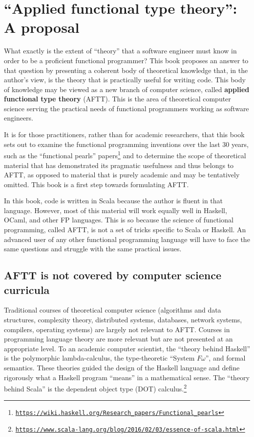 
\chapter{``Applied functional type theory'': A proposal\label{chap:Applied-functional-type}}

What exactly is the extent of ``theory'' that a software engineer
must know in order to be a proficient functional programmer? This
book proposes an answer to that question by presenting a coherent
body of theoretical knowledge that, in the author's view, is the theory
that is practically useful for writing code. This body of knowledge
may be viewed as a new branch of computer science, called \textbf{applied
functional type theory} (AFTT). This is the area of theoretical computer
science serving the practical needs of functional programmers working
as software engineers.

It is for those practitioners, rather than for academic researchers,
that this book sets out to examine the functional programming inventions
over the last 30 years, \textemdash{} such as the \textquotedblleft functional
pearls\textquotedblright{} papers\footnote{\texttt{\href{https://wiki.haskell.org/Research_papers/Functional_pearls}{https://wiki.haskell.org/Research\_papers/Functional\_pearls}}}
\textemdash{} and to determine the scope of theoretical material that
has demonstrated its pragmatic usefulness and thus belongs to AFTT,
as opposed to material that is purely academic and may be tentatively
omitted. This book is a first step towards formulating AFTT.

In this book, code is written in Scala because the author is fluent
in that language. However, most of this material will work equally
well in Haskell, OCaml, and other FP languages. This is so because
the science of functional programming, called AFTT, is not a set of
tricks specific to Scala or Haskell. An advanced user of any other
functional programming language will have to face the same questions
and struggle with the same practical issues.

\section{AFTT is not covered by computer science curricula}

Traditional courses of theoretical computer science (algorithms and
data structures, complexity theory, distributed systems, databases,
network systems, compilers, operating systems) are largely not relevant
to AFTT. Courses in programming language theory are more relevant
but are not presented at an appropriate level. To an academic computer
scientist, the ``theory behind Haskell'' is the polymorphic lambda-calculus,
the type-theoretic ``System $F\omega$'', and formal semantics.
These theories guided the design of the Haskell language and define
rigorously what a Haskell program ``means'' in a mathematical sense.
The ``theory behind Scala'' is the dependent object type (DOT) calculus.\footnote{\texttt{\href{https://www.scala-lang.org/blog/2016/02/03/essence-of-scala.html}{https://www.scala-lang.org/blog/2016/02/03/essence-of-scala.html}}}

